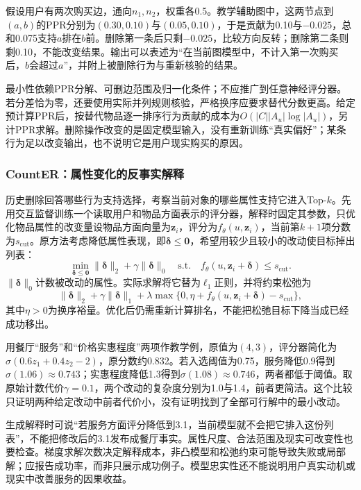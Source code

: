 假设用户有两次购买边，通向$n_1,n_2$，权重各0.5。教学辅助图中，这两节点到$(a,b)$的PPR分别为$(0.30,0.10)$与$(0.05,0.10)$，于是贡献为0.10与$-0.025$，总和0.075支持$a$排在$b$前。删除第一条后只剩$-0.025$，比较方向反转；删除第二条则剩0.10，不能改变结果。输出可以表述为“在当前图模型中，不计入第一次购买后，$b$会超过$a$”，并附上被删除行为与重新核验的结果。

最小性依赖PPR分解、可删边范围及归一化条件；不应推广到任意神经评分器。若分差恰为零，还要使用实际并列规则核验，严格换序应要求替代分数更高。给定预计算PPR后，按替代物品逐一排序行为贡献的成本为$O(|C||A_u|\log|A_u|)$，另计PPR求解。删除操作改变的是固定模型输入，没有重新训练“真实偏好”；某条行为足以改变输出，也不说明它是用户现实购买的原因。

\subsubsection{CountER：属性变化的反事实解释}
\label{sec:rs-counter}

历史删除回答哪些行为支持选择，考察当前对象的哪些属性支持它进入Top-$k$。先用交互监督训练一个读取用户和物品方面表示的评分器，解释时固定其参数，只优化物品属性的改变量设物品方面向量为$\bm z_i$，评分为$f_\theta(u,\bm z_i)$，当前第$k+1$项分数为$s_{\mathrm{cut}}$。原方法考虑降低属性表现，即$\bm\delta\leq\bm0$，希望用较少且较小的改动使目标掉出列表：
\begin{equation}
 \min_{\bm\delta\leq\bm0}
 \lVert\bm\delta\rVert_2+\gamma\lVert\bm\delta\rVert_0
 \quad\text{s.t.}\quad
 f_\theta(u,\bm z_i+\bm\delta)\leq s_{\mathrm{cut}}.
 \label{eq:rs-counter}
\end{equation}
$\lVert\bm\delta\rVert_0$计数被改动的属性。实际求解将它替为$\ell_1$正则，并将约束松弛为
\[
 \lVert\bm\delta\rVert_2+\gamma\lVert\bm\delta\rVert_1
 +\lambda\max\{0,\eta+f_\theta(u,\bm z_i+\bm\delta)-s_{\mathrm{cut}}\},
\]
其中$\eta>0$为换序裕量。优化后仍需重新计算排名，不能把松弛目标下降当成已经成功移出。

用餐厅“服务”和“价格实惠程度”两项作教学例，原值为$(4,3)$，评分器简化为$\sigma(0.6z_1+0.4z_2-2)$，原分数约0.832。若入选阈值为0.75，服务降低0.9得到$\sigma(1.06)\approx0.743$；实惠程度降低1.3得到$\sigma(1.08)\approx0.746$，两者都低于阈值。取原始计数代价$\gamma=0.1$，两个改动的复杂度分别为1.0与1.4，前者更简洁。这个比较只证明两种给定改动中前者代价小，没有证明找到了全部可行解中的最小改动。

生成解释时可说“若服务方面评分降低到3.1，当前模型就不会把它排入这份列表”，不能把修改后的3.1发布成餐厅事实。属性尺度、合法范围及现实可改变性也要检查。梯度求解次数决定解释成本，非凸模型和松弛约束可能导致失败或局部解；应报告成功率，而非只展示成功例子。模型忠实性还不能说明用户真实动机或现实中改善服务的因果收益。

